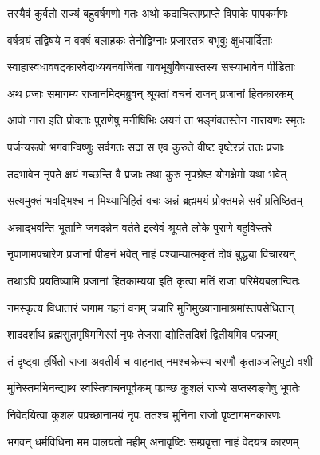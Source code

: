 \twolineshloka
{तस्यैवं कुर्वतो राज्यं बहुवर्षगणो गतः}
{अथो कदाचित्सम्प्राप्ते विपाके पापकर्मणः} %

\twolineshloka
{वर्षत्रयं तद्विषये न ववर्ष बलाहकः}
{तेनोद्विग्नाः प्रजास्तत्र बभूवुः क्षुधयार्दिताः} %

\twolineshloka
{स्वाहास्वधावषट्कारवेदाध्ययनवर्जिता}
{गावभूबुर्विषयास्तस्य सस्याभावेन पीडिताः} %

\twolineshloka
{अथ प्रजाः समागम्य राजानमिदमब्रुवन्}
{श्रूयतां वचनं राजन् प्रजानां हितकारकम्} %

\twolineshloka
{आपो नारा इति प्रोक्ताः पुराणेषु मनीषिभिः}
{अयनं ता भङ्गंवतस्तेन नारायणः स्मृतः} %

\twolineshloka
{पर्जन्यरूपो भगवान्विष्णुः सर्वगतः सदा}
{स एव कुरुते वीष्ट वृष्टेरन्नं ततः प्रजाः} %

\twolineshloka
{तदभावेन नृपते क्षयं गच्छन्ति वै प्रजाः}
{तथा कुरु नृपश्रेष्ठ योगक्षेमो यथा भवेत्} %


\twolineshloka
{सत्यमुक्तं भवद्भिश्च न मिथ्याभिहितं वचः}
{अन्नं ब्रह्ममयं प्रोक्तमन्ने सर्वं प्रतिष्ठितम्} %

\twolineshloka
{अन्नाद्भवन्ति भूतानि जगदन्नेन वर्तते}
{इत्येवं श्रूयते लोके पुराणे बहुविस्तरे} %

\twolineshloka
{नृपाणामपचारेण प्रजानां पीडनं भवेत्}
{नाहं पश्याम्यात्मकृतं दोषं बुद्ध्या विचारयन्} %

\twolineshloka
{तथाऽपि प्रयतिष्यामि प्रजानां हितकाम्यया}
{इति कृत्वा मतिं राजा परिमेयबलान्वितः} %

\twolineshloka
{नमस्कृत्य विधातारं जगाम गहनं वनम्}
{चचारि मुनिमुख्यानामाश्रमांस्तपसेधितान्} %

\twolineshloka
{शाददर्शाथ ब्रह्मसुतमृषिमगिरसं नृपः}
{तेजसा द्योतितदिशं द्वितीयमिव पद्मजम्} %

\twolineshloka
{तं दृष्ट्वा हर्षितो राजा अवतीर्य च वाहनात्}
{नमश्चक्रेस्य चरणौ कृताञ्जलिपुटो वशी} %

\twolineshloka
{मुनिस्तमभिनन्द्याथ स्वस्तिवाचनपूर्वकम्}
{पप्रच्छ कुशलं राज्ये सप्तस्वङ्गेषु भूपतेः} %

\twolineshloka
{निवेदयित्वा कुशलं पप्रच्छानामयं नृपः}
{ततश्च मुनिना राजो पृष्टागमनकारणः} %



\twolineshloka
{भगवन् धर्मविधिना मम पालयतो महीम्}
{अनावृष्टिः सम्प्रवृत्ता नाहं वेदयत्र कारणम्} %

